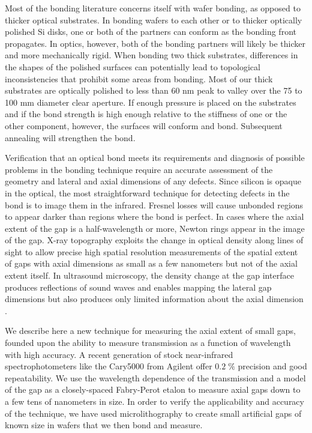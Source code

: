 \documentclass[osajnl,preprint,showpacs,superscriptaddress,12pt]{revtex4-1} %
\begin{document}
Most of the bonding literature concerns itself with wafer bonding, as opposed to thicker optical substrates.  In bonding wafers to each other or to thicker optically polished Si disks, one or both of the partners can conform as the bonding front propagates.  In optics, however, both of the bonding partners will likely be thicker and more mechanically rigid.  When bonding two thick substrates, differences in the shapes of the polished surfaces can potentially lead to topological inconsistencies that prohibit some areas from bonding.  Most of our thick substrates are optically polished to less than 60 nm peak to valley over the 75 to 100 mm diameter clear aperture.  If enough pressure is placed on the substrates and if the bond strength is high enough relative to the stiffness of one or the other component, however, the surfaces will conform and bond.  Subsequent annealing will strengthen the bond.


Verification that an optical bond meets its requirements and diagnosis of possible problems in the bonding technique require an accurate assessment of the geometry and lateral and axial dimensions of any defects.  Since silicon is opaque in the optical, the most straightforward technique for detecting defects in the bond is to image them in the infrared.  Fresnel losses will cause unbonded regions to appear darker than regions where the bond is perfect.  In cases where the axial extent of the gap is a half-wavelength or more, Newton rings appear in the image of the gap.  X-ray topography \cite{Mitani1990} exploits the change in optical density along lines of sight to allow precise high spatial resolution measurements of the spatial extent of gaps with axial dimensions as small as a few nanometers but not of the axial extent itself. In ultrasound microscopy, the density change at the gap interface produces reflections of sound waves and enables mapping the lateral gap dimensions but also produces only limited information about the axial dimension \cite{2000RScI...71.1869G}.


We describe here a new technique for measuring the axial extent of small gaps, founded upon the ability to measure transmission as a function of wavelength with high accuracy.   A recent generation of stock near-infrared spectrophotometers like the Cary5000 from Agilent offer $0.2\;\%$ precision and good repeatability.  We use the wavelength dependence of the transmission and a model of the gap as a closely-spaced Fabry-Perot etalon to measure axial gaps down to a few tens of nanometers in size.  In order to verify the applicability and accuracy of the technique, we have used microlithography to create small artificial gaps of known size in wafers that we then bond and measure.
\end{document}
